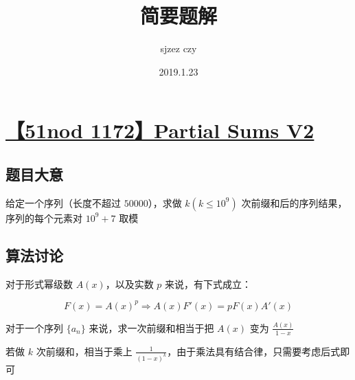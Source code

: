 \documentclass[UTF8]{article}
\author {sjzez czy}
\title {简要题解}
\date{2019.1.23}
\begin{document}
\maketitle

\tableofcontents

\newpage

\iffalse 
\section{\href{https://lydsy.com}{题目名称}}
\subsection{题目大意}
\subsection{算法讨论}
\subsection{时间复杂度}
\subsection{空间复杂度}
\fi

\section{\href{https://www.51nod.com/Challenge/Problem.html?problemId=1172}{【51nod 1172】Partial Sums V2}}

\subsection{题目大意}

给定一个序列（长度不超过 $50000$），求做 $k(k \le 10^9)$ 次前缀和后的序列结果，序列的每个元素对 $10^9+7$ 取模

\subsection{算法讨论}

对于形式幂级数 $A(x)$，以及实数 $p$ 来说，有下式成立：

$$
F(x)=A(x)^p \Rightarrow A(x)F'(x)=pF(x)A'(x)
$$

对于一个序列 $\{a_n\}$ 来说，求一次前缀和相当于把 $A(x)$ 变为 $\frac{A(x)}{1-x}$

若做 $k$ 次前缀和，相当于乘上 $\frac{1}{(1-x)^k}$，由于乘法具有结合律，只需要考虑后式即可
\end{document}
